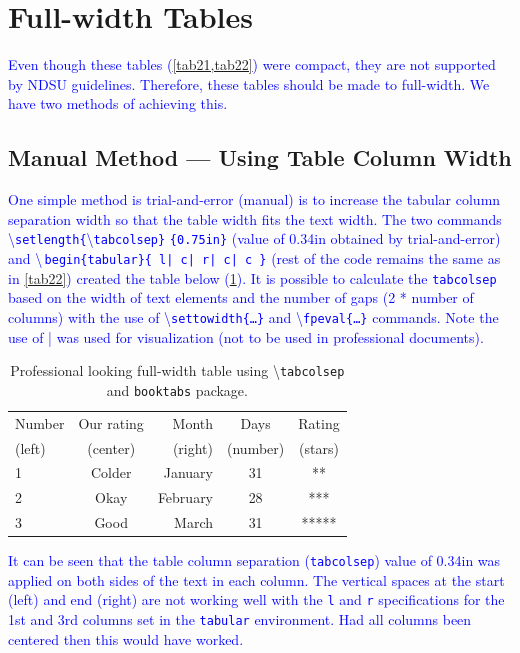\documentclass[phd,showgrids]{ndsu-thesis-2022}
\newcommand\italk[1]{\textcolor{blue}{#1}}  %
\newcommand\cmd[1]{\textbackslash\texttt{#1}}  %
\newcommand\vb[1]{\textcolor{blue}{\texttt{#1}}}%
\newcommand\vbc[1]{\textcolor{blue}{\textbackslash\,\texttt{#1}}}%
\begin{document}
\section{Full-width Tables}
\italk{Even though these tables (\cref{tab21,tab22}) were compact, they are not supported by NDSU guidelines. Therefore, these tables should be made to full-width. We have two methods of achieving this.}

\subsection{Manual Method --- Using Table Column Width}
\italk{One simple method is trial-and-error (manual) is to increase the tabular column separation width so that the table width fits the text width. The two commands \cmd{setlength\{}\cmd{tabcolsep\}} \vb{\{0.75in\}} (value of 0.34in obtained by trial-and-error) and \vbc{begin\{tabular\}\{ l|   c|   r|   c|   c \}} (rest of the code remains the same as in \cref{tab22}) created the table below (\cref{tab23}). It is possible to calculate the \vb{tabcolsep} based on the width of text elements and the number of gaps (2 * number of columns) with the use of \cmd{settowidth\{\ldots\}} and \cmd{fpeval\{\ldots\}} commands. Note the use of | was used for visualization (not to be used in professional documents).} 

\begin{table}[h!]
\centering
\caption{Professional looking full-width table using \cmd{tabcolsep} and \texttt{booktabs} package.}
\setlength{\tabcolsep}{0.34in}
\begin{tabular}{ l|   c|   r|   c|   c}
\toprule
Number & Our rating & Month & Days & Rating\\
(left) & (center)   & (right) & (number) & (stars)\\
\midrule
1 & Colder & January & 31 & **\\
2 & Okay   & February & 28 & ***\\
3 & Good   & March & 31 & *****\\
\bottomrule
\end{tabular}
\label{tab23}
\end{table}

\italk{It can be seen that the table column separation (\vb{tabcolsep}) value of 0.34in was applied on both sides of the text in each column. The vertical spaces at the start (left) and end (right) are not working well with the \vb{l} and \vb{r} specifications for the 1st and 3rd columns set in the \vb{tabular} environment. Had all columns been centered then this would have worked.}
\end{document}
